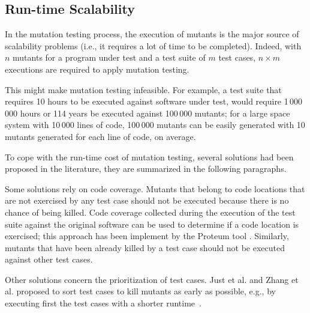 
\subsection{Run-time Scalability}
\label{sec:opt:execution}

In the mutation testing process, the execution of mutants is the major source of scalability problems (i.e., it requires a lot of time to be completed). Indeed, with $n$ mutants for a program under test and a test suite of $m$ test cases, $n \times m$ executions are required to apply mutation testing.

This might make mutation testing infeasible. For example, a test suite that requires 10 hours to be executed against software under test, would require 1\,000\,000 hours or 114 years be executed against 100\,000 mutants; for a large space system with 10\,000 lines of code, 100\,000 mutants can be easily generated  with 10 mutants generated for each line of code, on average.

To cope with the run-time cost of mutation testing, several solutions had been proposed in the literature, they are summarized in the following paragraphs.

Some solutions rely on code coverage. Mutants that belong to code locations that are not exercised by any test case should not be executed because there is no chance of being killed. Code coverage collected during the execution of the test suite against the original software can be used to determine if a code location is exercised; this approach has been implement by the Proteum tool \cite{delamaro1996proteum}.
Similarly, mutants that have been already killed by a test case should not be executed against other test cases.

Other solutions concern the prioritization of test cases. Just et al. \cite{just2012using} and Zhang et al. \cite{zhang2013faster} proposed to sort test cases to kill mutants as early as possible, e.g., by executing first the test cases with a shorter runtime~\cite{just2012using}. 

